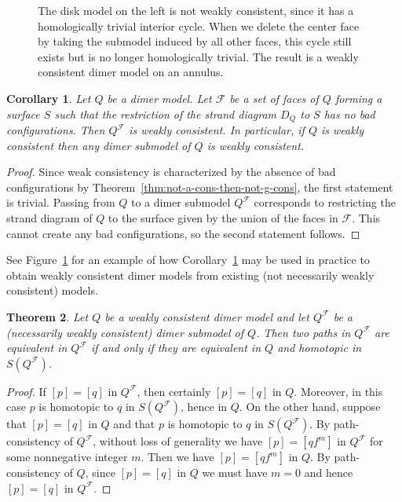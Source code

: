 \documentclass{article}
\newtheorem{thm}{Theorem}[section]
\newtheorem{cor}[thm]{Corollary}
\theoremstyle{definition}
\begin{document}
\def\svgwidth{300pt}
\begin{figure}	\centering
	
	\caption{The disk model on the left is not weakly consistent, since it has a homologically trivial interior cycle. When we delete the center face by taking the submodel induced by all other faces, this cycle still exists but is no longer homologically trivial. The result is a weakly consistent dimer model on an annulus.}
	\label{fig:submodel-disk-annulus}
\end{figure}

\begin{cor}\label{cor:dimer-submodel-consistent}
	Let $Q$ be a dimer model. Let $\mathcal F$ be a set of faces of $Q$ forming a surface $S$ such that the restriction of the strand diagram $D_Q$ to $S$ has no bad configurations. Then $Q^\mathcal F$ is weakly consistent. In particular, if $Q$ is weakly consistent then any dimer submodel of $Q$ is weakly consistent. 
\end{cor}
\begin{proof}
	Since weak consistency is characterized by the absence of bad configurations by Theorem~\ref{thm:not-a-cons-then-not-g-cons}, the first statement is trivial. 
	Passing from $Q$ to a dimer submodel $Q^{\mathcal F}$ corresponds to restricting the strand diagram of $Q$ to the surface given by the union of the faces in $\mathcal F$. This cannot create any bad configurations, so the second statement follows.
\end{proof}

See Figure~\ref{fig:submodel-disk-annulus} for an example of how Corollary~\ref{cor:dimer-submodel-consistent} may be used in practice to obtain weakly consistent dimer models from existing (not necessarily weakly consistent) models.

\begin{thm}\label{thm:submodel-path-equivalence}
	Let $Q$ be a weakly consistent dimer model and let $Q^{\mathcal F}$ be a (necessarily weakly consistent) dimer submodel of $Q$. Then two paths in $Q^{\mathcal F}$ are equivalent in $Q^{\mathcal F}$ if and only if they are equivalent in $Q$ and homotopic in $S(Q^{\mathcal F})$.
\end{thm}
\begin{proof}
	If $[p]=[q]$ in $Q^\mathcal F$, then certainly $[p]=[q]$ in $Q$. Moreover, in this case $p$ is homotopic to $q$ in $S(Q^\mathcal F)$, hence in $Q$.
		On the other hand, suppose that $[p]=[q]$ in $Q$ and that $p$ is homotopic to $q$ in $S(Q^{\mathcal F})$. By path-consistency of $Q^\mathcal F$, without loss of generality we have $[p]=[qf^m]$ in $Q^{\mathcal F}$ for some nonnegative integer $m$. Then we have $[p]=[qf^m]$ in $Q$. By path-consistency of $Q$, since $[p]=[q]$ in $Q$ we must have $m=0$ and hence $[p]=[q]$ in $Q^\mathcal F$. 
\end{proof}
\end{document}
